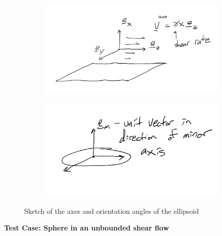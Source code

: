 \documentclass{article}
\begin{document}
\begin{figure}
  \centering
  \begin{subfigure}{0.59\textwidth}
    \includegraphics[width=\textwidth]{axes}
  \end{subfigure}
  \hfill
  \begin{subfigure}{0.49\textwidth}
    \includegraphics[width=\textwidth]{reference}
  \end{subfigure}
  \caption{Sketch of the axes and orientation angles of the ellipsoid}
  \label{fig:sketches}
\end{figure}

\textbf{Test Case: Sphere in an unbounded shear flow}
\end{document}
